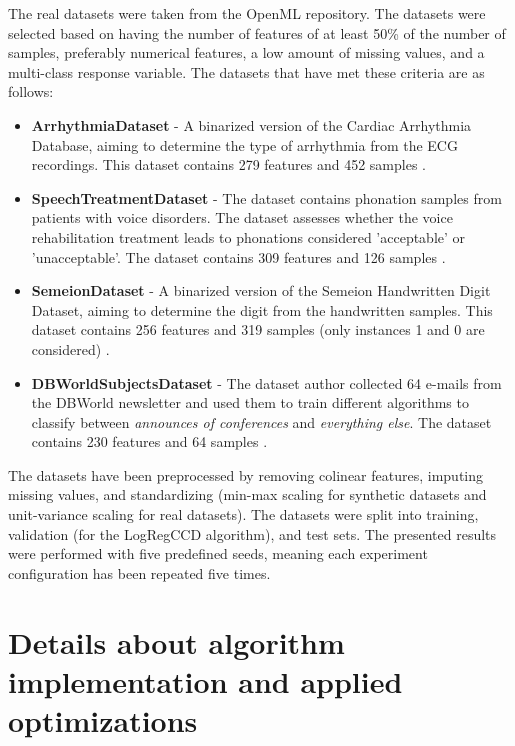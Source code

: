 \documentclass[11pt]{article}
\begin{document}
The real datasets were taken from the OpenML \cite{OpenML2013} repository. The datasets were selected based on having the number of features of at least 50\% of the number of samples, preferably numerical features, a low amount of missing values, and a multi-class response variable. The datasets that have met these criteria are as follows:
\begin{itemize}
    \item \textbf{ArrhythmiaDataset} - A binarized version of the Cardiac Arrhythmia Database, aiming to determine the type of arrhythmia from the ECG recordings. This dataset contains 279 features and 452 samples \cite{arrhythmia_5}.
    \item \textbf{SpeechTreatmentDataset} - The dataset contains phonation samples from patients with voice disorders. The dataset assesses whether the voice rehabilitation treatment leads to phonations considered 'acceptable' or 'unacceptable'. The dataset contains 309 features and 126 samples \cite{lsvt_voice_rehabilitation_282}.
    
    \item \textbf{SemeionDataset} - A binarized version of the Semeion Handwritten Digit Dataset, aiming to determine the digit from the handwritten samples. This dataset contains 256 features and 319 samples (only instances 1 and 0 are considered) \cite{semeion_handwritten_digit_178}.
    \item \textbf{DBWorldSubjectsDataset} - The dataset author collected 64 e-mails from the DBWorld newsletter and used them to train different algorithms to classify between \textit{announces of conferences} and \textit{everything else}. The dataset contains 230 features and 64 samples \cite{dbworld_e-mails_219}.

\end{itemize}

The datasets have been preprocessed by removing colinear features, imputing missing values, and standardizing (min-max scaling for synthetic datasets and unit-variance scaling for real datasets). The datasets were split into training, validation (for the LogRegCCD algorithm), and test sets. The presented results were performed with five predefined seeds, meaning each experiment configuration has been repeated five times.


\section{Details about algorithm implementation and applied optimizations}
\end{document}
